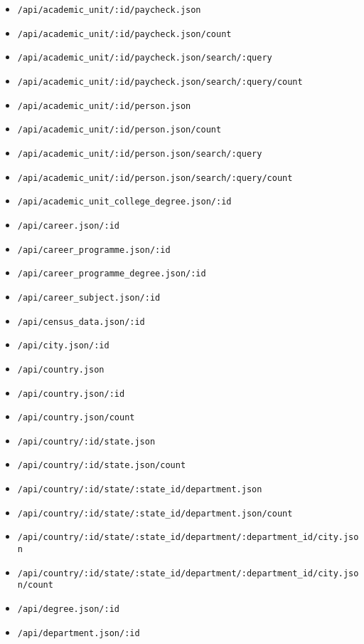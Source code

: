 \begin{itemize}
    \item \lstinline$/api/academic_unit/:id/paycheck.json$
    \item \lstinline$/api/academic_unit/:id/paycheck.json/count$
    \item \lstinline$/api/academic_unit/:id/paycheck.json/search/:query$
    \item \lstinline$/api/academic_unit/:id/paycheck.json/search/:query/count$
    \item \lstinline$/api/academic_unit/:id/person.json$
    \item \lstinline$/api/academic_unit/:id/person.json/count$
    \item \lstinline$/api/academic_unit/:id/person.json/search/:query$
    \item \lstinline$/api/academic_unit/:id/person.json/search/:query/count$
    \item \lstinline$/api/academic_unit_college_degree.json/:id$
    \item \lstinline$/api/career.json/:id$
    \item \lstinline$/api/career_programme.json/:id$
    \item \lstinline$/api/career_programme_degree.json/:id$
    \item \lstinline$/api/career_subject.json/:id$
    \item \lstinline$/api/census_data.json/:id$
    \item \lstinline$/api/city.json/:id$
    \item \lstinline$/api/country.json$
    \item \lstinline$/api/country.json/:id$
    \item \lstinline$/api/country.json/count$
    \item \lstinline$/api/country/:id/state.json$
    \item \lstinline$/api/country/:id/state.json/count$
    \item \lstinline$/api/country/:id/state/:state_id/department.json$
    \item \lstinline$/api/country/:id/state/:state_id/department.json/count$
    \item \lstinline$/api/country/:id/state/:state_id/department/:department_id/city.json$
    \item \lstinline$/api/country/:id/state/:state_id/department/:department_id/city.json/count$
    \item \lstinline$/api/degree.json/:id$
    \item \lstinline$/api/department.json/:id$

\end{itemize}
